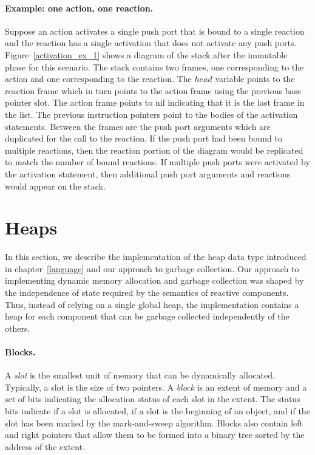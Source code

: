 \paragraph{Example:  one action, one reaction.}
Suppose an action activates a single push port that is bound to a single reaction and the reaction has a single activation that does not activate any push ports.
Figure~\ref{activation_ex_1} shows a diagram of the stack after the immutable phase for this scenario.
The stack contains two frames, one corresponding to the action and one corresponding to the reaction.
The $head$ variable points to the reaction frame which in turn points to the action frame using the previous base pointer slot.
The action frame points to nil indicating that it is the last frame in the list.
The previous instruction pointers point to the bodies of the activation statements.
Between the frames are the push port arguments which are duplicated for the call to the reaction.
If the push port had been bound to multiple reactions, then the reaction portion of the diagram would be replicated to match the number of bound reactions.
If multiple push ports were activated by the activation statement, then additional push port arguments and reactions would appear on the stack.

\section{Heaps}

In this section, we describe the implementation of the heap data type introduced in chapter~\ref{language} and our approach to garbage collection.
Our approach to implementing dynamic memory allocation and garbage collection was shaped by the independence of state required by the semantics of reactive components.
Thus, instead of relying on a single global heap, the implementation contains a heap for each component that can be garbage collected independently of the others.

\paragraph{Blocks.}
A \emph{slot} is the smallest unit of memory that can be dynamically allocated.
Typically, a slot is the size of two pointers.
A \emph{block} is an extent of memory and a set of bits indicating the allocation status of each slot in the extent.
The status bits indicate if a slot is allocated, if a slot is the beginning of an object, and if the slot has been marked by the mark-and-sweep algorithm.
Blocks also contain left and right pointers that allow them to be formed into a binary tree sorted by the address of the extent.

